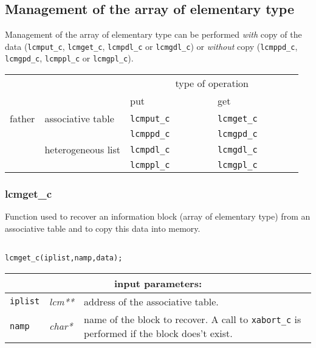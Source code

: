 \subsection{Management of the array of elementary type}

Management of the array of elementary type can be performed {\sl with} copy of the data ({\tt lcmput\_c}, {\tt lcmget\_c}, {\tt lcmpdl\_c} or
{\tt lcmgdl\_c}) or {\sl without} copy ({\tt lcmppd\_c}, {\tt lcmgpd\_c}, {\tt lcmppl\_c} or
{\tt lcmgpl\_c}).

\vskip 0.4cm

\begin{center}
\begin{tabular}{|c|l|l|l|}
\cline{3-4}
\multicolumn{2}{c|}{} & \multicolumn{2}{c|}{type of operation} \\
\cline{3-4}
\multicolumn{2}{c|}{} & put~~~~~~~~~~~~~ & get~~~~~~~~~~~~~ \\
\hline
father & associative table & {\tt lcmput\_c} & {\tt lcmget\_c} \\
       &                   & {\tt lcmppd\_c} & {\tt lcmgpd\_c} \\
\cline{2-4}
       & heterogeneous list & {\tt lcmpdl\_c} & {\tt lcmgdl\_c} \\
       &                   & {\tt lcmppl\_c} & {\tt lcmgpl\_c} \\
\hline
\end{tabular}
\end{center}

\subsubsection{lcmget\_c}

Function used to recover an information block (array of elementary type) from an associative table and to copy
this data into memory.

\begin{verbatim}

lcmget_c(iplist,namp,data);
\end{verbatim}

\noindent
\begin{tabular}{|p{1.5cm}|p{2cm}|p{11cm}|}
\hline
\multicolumn{3}{|c|}{\bf input parameters:} \\
\hline
{\tt iplist} & {\it lcm**} & address of the associative table. \\
\hline
{\tt namp} & {\it char*} &  name of the block to recover. 
                                    A call to {\tt xabort\_c} is performed if the block does't exist. \\
\hline
\end{tabular}

